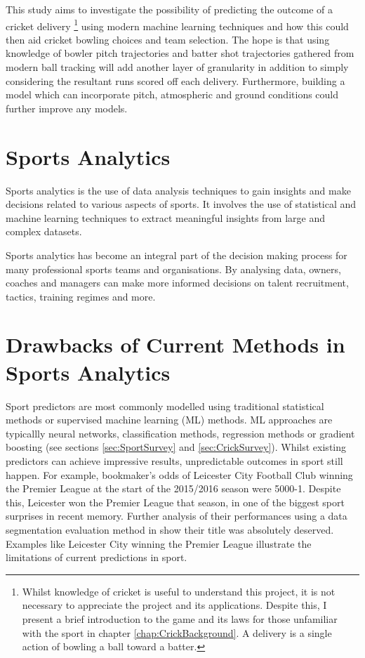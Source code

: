 \documentclass[12pt,a4paper]{report}
\theoremstyle{definition}
\begin{document}
This study aims to investigate the possibility of predicting the outcome of a cricket delivery \footnote{Whilst knowledge of cricket is useful to understand this project, it is not necessary to appreciate the project and its applications. Despite this, I present a brief introduction to the game and its laws for those unfamiliar with the sport in chapter \ref{chap:CrickBackground}. A delivery is a single action of bowling a ball toward a batter.} using modern machine learning techniques and how this could then aid cricket bowling choices and team selection. 
The hope is that using knowledge of bowler pitch trajectories and batter shot trajectories gathered from modern ball tracking will add another layer of granularity in addition to simply considering the resultant runs scored off each delivery. 
Furthermore, building a model which can incorporate pitch, atmospheric and ground conditions could further improve any models. 

\section{Sports Analytics}

Sports analytics is the use of data analysis techniques to gain insights and make decisions related to various aspects of sports.
It involves the use of statistical and machine learning techniques to extract meaningful insights from large and complex datasets.

Sports analytics has become an integral part of the decision making process for many professional sports teams and organisations. 
By analysing data, owners, coaches and managers can make more informed decisions on talent recruitment, tactics, training regimes and more.

\section{Drawbacks of Current Methods in Sports Analytics}
 
Sport predictors are most commonly modelled using traditional statistical methods or supervised machine learning (ML) methods.
ML approaches are typicallly neural networks, classification methods, regression methods or gradient boosting \citep{horvat2020} (see sections \ref{sec:SportSurvey} and \ref{sec:CrickSurvey}).
Whilst existing predictors can achieve impressive results, unpredictable outcomes in sport still happen. 
For example, bookmaker's odds of Leicester City Football Club winning the Premier League at the start of the 2015/2016 season were 5000-1.
Despite this, Leicester won the Premier League that season, in one of the biggest sport surprises in recent memory.
Further analysis of their performances using a data segmentation evaluation method in \citet{Ruiz2017} show their title was absolutely deserved.
Examples like Leicester City winning the Premier League illustrate the limitations of current predictions in sport.
\end{document}
